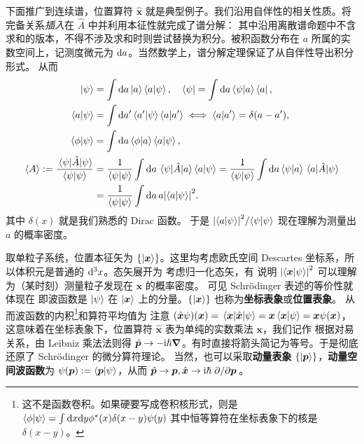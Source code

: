 下面推广到连续谱，位置算符 $\hat{\bm x}$ 就是典型例子。我们沿用自伴性的相关性质。将完备关系\textit{插入}在 $\hat A$ 中并利用本征性就完成了谱分解：
其中沿用离散谱命题中不含求和的版本，不得不涉及求和时则尝试替换为积分。被积函数分布在 $a$ 所属的实数空间上，记测度微元为 $\dd a$。当然数学上，谱分解定理保证了从自伴性导出积分形式。
从而
\begin{align}
    \ket{\psi} &= \int\d a \ket{a}\ip{a}{\psi},\quad \bra{\psi} = \int\d a \ip{\psi}{a}\bra{a},\\
    \ip{a}{\psi} &= \int\d a' \ip{a'}{\psi} \ip{a}{a'} \iff \ip{a}{a'} = \delta(a-a'),\\
    \ip{\phi}{\psi} &= \int \d{a} \ip{\phi}{a} \ip{a}{\psi},\\
    \ev{A} := \frac{\ev{\hat A}{\psi}}{\ip{\psi}} &= \frac{1}{\ip{\psi}}\int \d{a} \mel{\psi}{\hat A}{a} \ip{a}{\psi} = \frac{1}{\ip{\psi}}\int \d{a} \ip{\psi}{a} \mel{a}{\hat A}{\psi}\\
    &= \frac{1}{\ip{\psi}}\int \d{a} a \abs{\ip{a}{\psi}}^2.
\end{align}
其中 $\delta(x)$ 就是我们熟悉的 Dirac 函数。
于是 $\abs{\ip{a}{\psi}}^2/{\ip{\psi}}$ 现在理解为测量出 $a$ 的概率密度。

取单粒子系统，位置本征矢为 $\{\ket{\bm x}\}$。这里均考虑欧氏空间 Descartes 坐标系，所以体积元是普通的 $\dd[3]x$。态矢展开为
考虑归一化态矢，有
说明 $\abs{\ip{\bm x}{\psi}}^2$ 可以理解为（某时刻）测量粒子发现在 $\bm x$ 的概率密度。
可见 Schr\"odinger 表述的等价性就体现在
即波函数是 $\ket{\psi}$ 在 $\ket{\bm x}$ 上的分量。$\{\ket{\bm x}\}$ 也称为\textbf{坐标表象}或\textbf{位置表象}。
从而波函数的内积\footnote{这不是函数卷积。如果硬要写成卷积核形式，则是 $\ip{\phi}{\psi}=
\int\d x \d y \phi^*(x)\delta(x-y)\psi(y)$
其中恒等算符在坐标表象下的核是 $\delta(x-y)$。}和算符平均值为
注意 $(\hat{\bm x} \psi)(\bm x) = \mel{\bm x}{\hat{\bm x}}{\psi} = \bm x\ip{\bm x}{\psi} = \bm x \psi(\bm x)$，这意味着在坐标表象下，位置算符 $\hat{\bm x}$ 表为单纯的实数乘法 $\bm x$，我们记作
根据对易关系，由 Leibniz 乘法法则得 $\hat{\bm p} \to -\mathrm{i}\hbar\grad$。有时直接将箭头简记为等号。于是彻底还原了 Schr\"odinger 的微分算符理论。
当然，也可以采取\textbf{动量表象} $\{\ket{\bm p}\}$，\textbf{动量空间波函数}为 $\psi(\bm p) := \ip{\bm p}{\psi}$，从而 $\hat{\bm p}\to\bm p,\hat{\bm x}\to\mathrm{i}\hbar\pdv*{\bm p}$。

